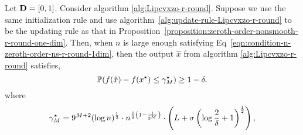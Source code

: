 \begin{corollary}
\label{corollary:zeroth-order-nonsmooth-r-round-one-dim}
Let $\mathbf{D} = [0, 1]$. Consider algorithm 
\ref{alg:Lipcvxzo-r-round}. Suppose we use the same initialization 
rule and use algorithm~\ref{alg:update-rule-Lipcvxzo-r-round} to 
be the updating rule as that in Proposition~\ref{proposition:zeroth-order-nonsmooth-r-round-one-dim}.
Then, when $n$ is large enough satisfying Eq~\eqref{eqn:condition-n-zeroth-order-ns-r-round-1dim},
then the output $\hat{x}$ from algorithm \ref{alg:Lipcvxzo-r-round} satisfies, 
\begin{equation*}
\mathbb{P}(f(\hat{x}) - f(x^\star) \leq \gamma_M^\star) \geq 1-\delta. 
\end{equation*}
where
\begin{equation}
\label{eqn:zo-ns-r-third-part}
\gamma_M^\star = 9^{M+2} (\log n)^{\frac{1}{2}} \cdot  n^{\frac{1}{2}\left(1-\frac{1}{3^M}\right)} \cdot
 	\left(L  + \sigma \left(\log \frac{2}{\delta}+1\right)^{\frac{1}{2}}\right), 
\end{equation}
%

\end{corollary}
